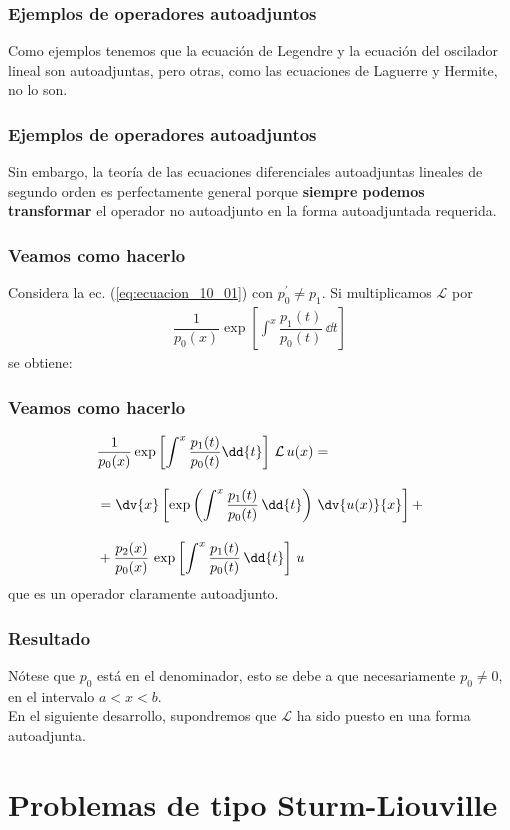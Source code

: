 \begin{frame}
\frametitle{Ejemplos de operadores autoadjuntos}
Como ejemplos tenemos que la ecuación de Legendre y la ecuación del oscilador lineal son autoadjuntas, pero otras, como las ecuaciones de Laguerre y Hermite, no lo son.
\end{frame}
\begin{frame}
\frametitle{Ejemplos de operadores autoadjuntos}
Sin embargo, la teoría de las ecuaciones diferenciales autoadjuntas lineales de segundo orden es perfectamente general porque \textbf{siempre podemos transformar} el operador no autoadjunto en la forma autoadjuntada requerida.
\end{frame}
\begin{frame}
\frametitle{Veamos como hacerlo}
Considera la ec. (\ref{eq:ecuacion_10_01}) con $p_{0}^{\prime} \neq p_{1}$. Si multiplicamos $\mathcal{L}$ por
\begin{align*}
\dfrac{1}{p_{0}(x)} \exp \left[ \int^{x} \dfrac{p_{1}(t)}{p_{0}(t)} \, \dd{t} \right]
\end{align*}
se obtiene:
\end{frame}
\begin{frame}
\frametitle{Veamos como hacerlo}
\begin{align}
\begin{aligned}
&\dfrac{1}{p_{0}(x)} \exp \left[ \int^{x} \dfrac{p_{1}(t)}{p_{0}(t)} \dd{t} \right] \, \mathcal{L} \, u(x) = \\[1em]
&= \dv{x} \left[ \exp \left( \int^{x} \dfrac{p_{1}(t)}{p_{0}(t)} \, \dd{t} \right) \, \dv{u(x)}{x} \right] + \\[1em]
&+ \dfrac{p_{2}(x)}{p_{0}(x)} \, \exp \left[ \int^{x} \dfrac{p_{1}(t)}{p_{0}(t)} \, \dd{t} \right] \, u
\end{aligned}
\label{eq:ecuacion_10_07}
\end{align}
que es un operador claramente autoadjunto.
\end{frame}
\begin{frame}
\frametitle{Resultado}
Nótese que $p_{0}$ está en el denominador, esto se debe a que necesariamente $p_{0} \neq 0$, en el intervalo $a < x < b$.
\\
\bigskip
\pause
En el siguiente desarrollo, supondremos que $\mathcal{L}$ ha sido puesto en una forma autoadjunta.
\end{frame}
\section{Problemas de tipo Sturm-Liouville}
